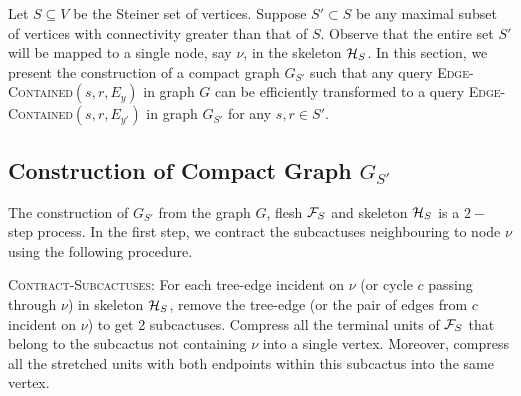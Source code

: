 \label{sec:compact-graph-section}
Let $S\subseteq V$ be the Steiner set of vertices. Suppose $S'\subset S$ be any maximal subset of vertices with connectivity greater than that of $S$.  Observe that the entire set $S'$ will be mapped to a single node, say $\nu$, in the skeleton ${\cal H}_S$. In this section, we present the construction of a compact graph $G_{S'}$ such that any query \textsc{Edge-Contained}$(s,r,E_y)$ in graph $G$ can be efficiently transformed to a query \textsc{Edge-Contained}$(s,r,E_{y'})$ in graph $G_{S'}$ for any $s,r\in S'$.
\vspace{-2mm}
\subsection{Construction of Compact Graph \texorpdfstring{$G_{S'}$}{}}\label{sec:compact-graph}


The construction of $G_{S'}$ from the graph $G$, flesh ${\cal F}_S$ and skeleton ${\cal H}_S$ is a $2-$step process. In the first step, we contract the subcactuses neighbouring to node $\nu$ using the following procedure.

{\textsc{Contract-Subcactuses}}: For each tree-edge incident on $\nu$ (or cycle $c$ passing through $\nu$) in skeleton ${\cal H}_S$, remove the tree-edge (or the pair of edges from $c$ incident on $\nu$) to get 2 subcactuses. Compress all the terminal units of ${\cal F}_S$ that belong to the subcactus not containing $\nu$ into a single vertex. Moreover, compress all the stretched units with both endpoints within this subcactus into the same vertex.


